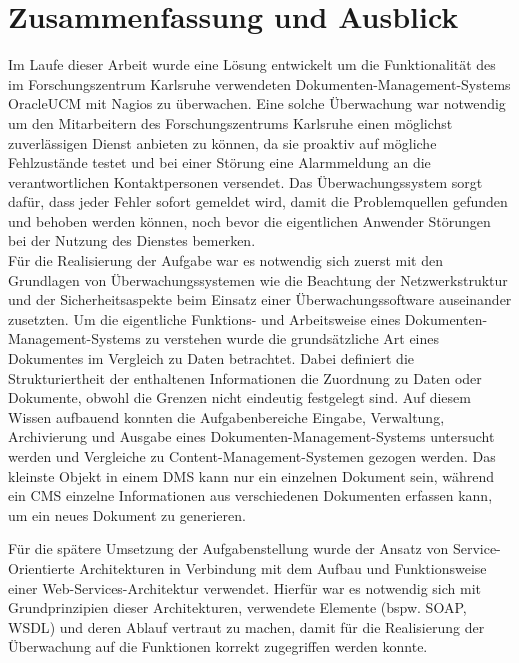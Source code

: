 \section{Zusammenfassung und Ausblick}

Im Laufe dieser Arbeit wurde eine Lösung entwickelt um die Funktionalität des im Forschungszentrum Karlsruhe verwendeten Dokumenten-Management-Systems \gls{OracleUCM} mit Nagios zu überwachen.
Eine solche Überwachung war notwendig um den Mitarbeitern des Forschungszentrums Karlsruhe einen möglichst zuverlässigen Dienst anbieten zu können, da sie proaktiv auf mögliche Fehlzustände testet und bei einer Störung eine Alarmmeldung an die verantwortlichen Kontaktpersonen versendet. 
Das Überwachungssystem sorgt dafür, dass jeder Fehler sofort gemeldet wird, damit die Problemquellen gefunden und behoben werden können, noch bevor die eigentlichen Anwender Störungen bei der Nutzung des Dienstes bemerken.\\

Für die Realisierung der Aufgabe war es notwendig sich zuerst mit den Grundlagen von Überwachungssystemen wie die Beachtung der Netzwerkstruktur und der Sicherheitsaspekte beim Einsatz einer Überwachungssoftware auseinander zusetzten. 
Um die eigentliche Funktions- und Arbeitsweise eines Dokumenten-Management-Systems zu verstehen wurde die grundsätzliche Art eines Dokumentes im Vergleich zu Daten betrachtet.
Dabei definiert die Strukturiertheit der enthaltenen Informationen die Zuordnung zu Daten oder Dokumente, obwohl die Grenzen nicht eindeutig festgelegt sind.
Auf diesem Wissen aufbauend konnten die Aufgabenbereiche Eingabe, Verwaltung, Archivierung und Ausgabe eines Dokumenten-Management-Systems untersucht werden und Vergleiche zu Content-Management-Systemen gezogen werden.
Das kleinste Objekt in einem \gls{DMS} kann nur ein einzelnen Dokument sein, während ein \gls{CMS} einzelne Informationen aus verschiedenen Dokumenten erfassen kann, um ein neues Dokument zu generieren.

Für die spätere Umsetzung der Aufgabenstellung wurde der Ansatz von Service-Orientierte Architekturen in Verbindung mit dem Aufbau und Funktionsweise einer Web-Services-Architektur verwendet.
Hierfür war es notwendig sich mit Grundprinzipien dieser Architekturen, verwendete Elemente (bspw. \gls{SOAP}, \gls{WSDL}) und deren Ablauf vertraut zu machen, damit für die Realisierung der Überwachung auf die Funktionen korrekt zugegriffen werden konnte.\\


